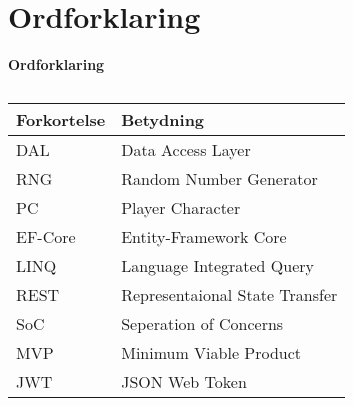 \section{Ordforklaring}

\textbf{Ordforklaring}\\
\begin{table}[H]
  \caption{}
  \label{tab:}
  \begin{tabular}{|p{5cm}|p{5cm}|}
    \hline
    Forkortelse & Betydning\\
    \hline
    DAL & Data Access Layer\\
    \hline
    RNG & Random Number Generator\\
    \hline
    PC & Player Character\\
    \hline
    EF-Core & Entity-Framework Core\\
    \hline
    LINQ & Language Integrated Query\\
    \hline
    REST & Representaional State Transfer\\
    \hline
    SoC & Seperation of Concerns\\
    \hline
    MVP & Minimum Viable Product\\
    \hline
    JWT & JSON Web Token\\
    \hline
  \end{tabular}
\end{table}
